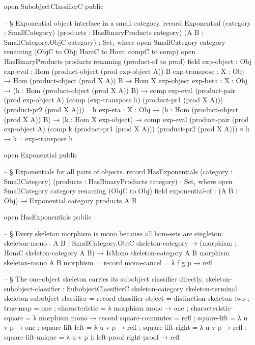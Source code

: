 \documentclass[11pt]{article}
\begin{document}
\begin{code}
open SubobjectClassifierC public

-- § Exponential object interface in a small category.
record Exponential
  (category : SmallCategory)
  (products : HasBinaryProducts category)
  (A B : SmallCategory.ObjC category) : Set₁ where
  open SmallCategory category renaming (ObjC to Obj; HomC to Hom; compC to comp)
  open HasBinaryProducts products renaming (product-of to prod)
  field
    exp-object    : Obj
    exp-eval      : Hom
                      (product-object (prod exp-object A))
                      B
    exp-transpose : {X : Obj} →
                    Hom (product-object (prod X A)) B →
                    Hom X exp-object
    exp-beta      : {X : Obj} →
                    (h : Hom (product-object (prod X A)) B) →
                    comp exp-eval
                      (product-pair (prod exp-object A)
                        (comp (exp-transpose h)
                          (product-pr1 (prod X A)))
                        (product-pr2 (prod X A))) ≡ h
    exp-eta       : {X : Obj} →
                    (h : Hom (product-object (prod X A)) B) →
                    (k : Hom X exp-object) →
                    comp exp-eval
                      (product-pair (prod exp-object A)
                        (comp k (product-pr1 (prod X A)))
                        (product-pr2 (prod X A))) ≡ h →
                    k ≡ exp-transpose h

open Exponential public

-- § Exponentials for all pairs of objects.
record HasExponentials
  (category : SmallCategory)
  (products : HasBinaryProducts category) : Set₁ where
  open SmallCategory category renaming (ObjC to Obj)
  field
    exponential-of : (A B : Obj) → Exponential category products A B

open HasExponentials public

-- § Every skeleton morphism is mono because all hom-sets are singleton.
skeleton-mono :
  {A B : SmallCategory.ObjC skeleton-category} →
  (morphism : HomC skeleton-category A B) →
  IsMono skeleton-category {A} {B} morphism
skeleton-mono {A} {B} morphism = record
  { mono-cancel = λ f g p → refl
  }

-- § The one-object skeleton carries its subobject classifier directly.
skeleton-subobject-classifier :
  SubobjectClassifierC skeleton-category skeleton-terminal
skeleton-subobject-classifier = record
  { classifier-object = distinction-skeleton-two
  ; true-map          = one
  ; characteristic    = λ morphism mono → one
  ; characteristic-square = λ morphism mono → record
      { square-commutes    = refl
      ; square-lift        = λ u v p → one
      ; square-lift-left   = λ u v p → refl
      ; square-lift-right  = λ u v p → refl
      ; square-lift-unique = λ u v p h left-proof right-proof → refl
      }
  }


\end{code}
\end{document}
